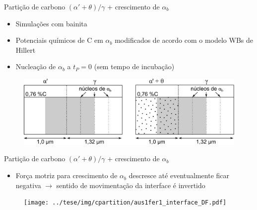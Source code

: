 \begin{frame}{Partição de carbono $(\alpha' + \theta)/\gamma$ + crescimento de $\alpha_b$}
  \begin{itemize}
    \item Simulações com bainita
    \item Potenciais químicos de C em $\alpha_b$ modificados de acordo com o modelo WBs de Hillert
    \item Nucleação de $\alpha_b$ a $t_P = 0$ (sem tempo de incubação)
  \end{itemize}

  \begin{figure}
    \includegraphics[width=.8\textwidth]{img/simulations_bainite.pdf}
  \end{figure}
\end{frame}


\begin{frame}{Partição de carbono $(\alpha' + \theta)/\gamma$ + crescimento de $\alpha_b$}
  \begin{itemize}
    \item Força motriz para crescimento de $\alpha_b$ descresce até eventualmente ficar negativa $\rightarrow$ sentido de movimentação da interface é invertido
  \end{itemize}

  \begin{figure}
    \texttt{[image: ../tese/img/cpartition/aus1fer1\_interface\_DF.pdf]}
  \end{figure}
\end{frame}


